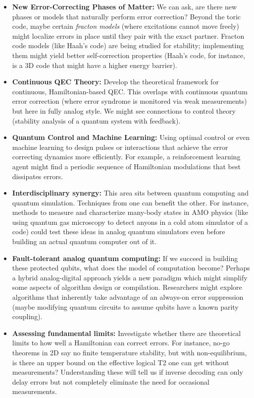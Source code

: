 \documentclass[11pt]{article}
\begin{document}
\begin{itemize}
    \item \textbf{New Error-Correcting Phases of Matter:} We can ask, are there new phases or models that naturally perform error correction? Beyond the toric code, maybe certain \textit{fracton models} (where excitations cannot move freely) might localize errors in place until they pair with the exact partner. Fracton code models (like Haah's code) are being studied for stability; implementing them might yield better self-correction properties (Haah's code, for instance, is a 3D code that might have a higher energy barrier).
    \item \textbf{Continuous QEC Theory:} Develop the theoretical framework for continuous, Hamiltonian-based QEC. This overlaps with continuous quantum error correction (where error syndrome is monitored via weak measurements) but here in fully analog style. We might see connections to control theory (stability analysis of a quantum system with feedback).
    \item \textbf{Quantum Control and Machine Learning:} Using optimal control or even machine learning to design pulses or interactions that achieve the error correcting dynamics more efficiently. For example, a reinforcement learning agent might find a periodic sequence of Hamiltonian modulations that best dissipates errors.
    \item \textbf{Interdisciplinary synergy:} This area sits between quantum computing and quantum simulation. Techniques from one can benefit the other. For instance, methods to measure and characterize many-body states in AMO physics (like using quantum gas microscopy to detect anyons in a cold atom simulator of a code) could test these ideas in analog quantum simulators even before building an actual quantum computer out of it.
    \item \textbf{Fault-tolerant analog quantum computing:} If we succeed in building these protected qubits, what does the model of computation become? Perhaps a hybrid analog-digital approach yields a new paradigm which might simplify some aspects of algorithm design or compilation. Researchers might explore algorithms that inherently take advantage of an always-on error suppression (maybe modifying quantum circuits to assume qubits have a known parity coupling).
    \item \textbf{Assessing fundamental limits:} Investigate whether there are theoretical limits to how well a Hamiltonian can correct errors. For instance, no-go theorems in 2D say no finite temperature stability, but with non-equilibrium, is there an upper bound on the effective logical T2 one can get without measurements? Understanding these will tell us if inverse decoding can only delay errors but not completely eliminate the need for occasional measurements.
\end{itemize}
\end{document}

